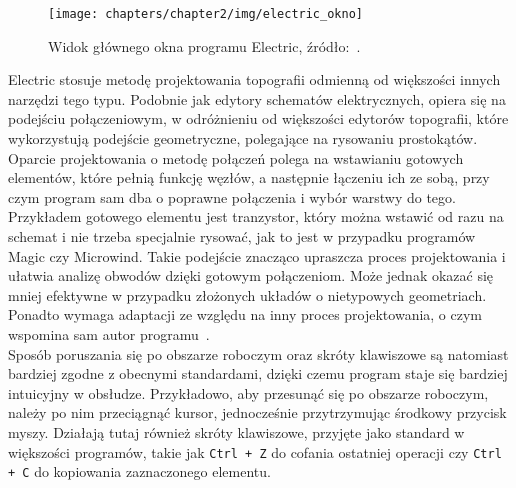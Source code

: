 \begin{figure}[h]
    \centering
    \texttt{[image: chapters/chapter2/img/electric\_okno]}
    \caption[Widok głównego okna programu Electric.]{Widok głównego okna programu Electric, źródło:~\cite{electric_sfs}.}
    \label{fig:electric_okno}
\end{figure}
\indent Electric stosuje metodę projektowania topografii odmienną od większości innych narzędzi tego typu.
Podobnie jak edytory schematów elektrycznych, opiera się na podejściu połączeniowym,
w odróżnieniu od większości edytorów topografii, które wykorzystują podejście geometryczne,
polegające na rysowaniu prostokątów.
Oparcie projektowania o metodę połączeń polega na wstawianiu gotowych elementów,
które pełnią funkcję węzłów, %
a następnie łączeniu ich ze sobą, przy czym program sam dba o poprawne połączenia i wybór warstwy do tego.
Przykładem gotowego elementu jest tranzystor,
który można wstawić od razu na schemat
i nie trzeba specjalnie rysować, jak to jest w przypadku programów Magic czy Microwind.
Takie podejście znacząco upraszcza proces projektowania i ułatwia analizę obwodów dzięki gotowym połączeniom.
Może jednak okazać się mniej efektywne w przypadku złożonych układów o nietypowych geometriach.
Ponadto wymaga adaptacji ze względu na inny proces projektowania,
o czym wspomina sam autor programu~\cite{electric_computer_aids}.\\
\indent Sposób poruszania się po obszarze roboczym oraz skróty klawiszowe są natomiast bardziej zgodne z obecnymi standardami,
dzięki czemu program staje się bardziej intuicyjny w obsłudze.
Przykładowo, aby przesunąć się po obszarze roboczym, należy po nim przeciągnąć kursor,
jednocześnie przytrzymując środkowy przycisk myszy.
Działają tutaj również skróty klawiszowe, przyjęte jako standard w większości programów,
takie jak \texttt{Ctrl + Z} do cofania ostatniej operacji czy \texttt{Ctrl + C} do kopiowania zaznaczonego elementu.
